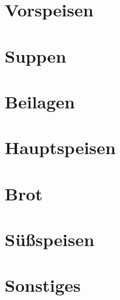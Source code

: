 \documentclass[twocolumn]{cookbook}
\begin{document}
\chapter{Vorspeisen}


\chapter{Suppen}


\chapter{Beilagen}


\chapter{Hauptspeisen}


\chapter{Brot}


\chapter{Süßspeisen}


\chapter{Sonstiges}


\printbibliography
\printindex[region]
\printindex[ingredient]
\printindex[vegetarian]
\printindex[vegan]
\printindex
\end{document}
